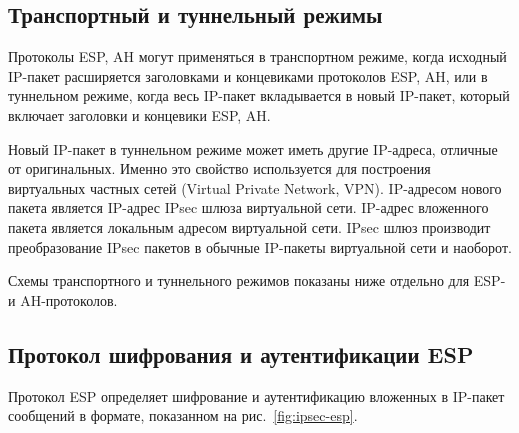 \subsection{Транспортный и туннельный режимы}

Протоколы ESP, AH могут применяться в транспортном режиме, когда исходный IP-пакет расширяется заголовками и концевиками протоколов ESP, AH, или в туннельном режиме, когда весь IP-пакет вкладывается в новый IP-пакет, который включает заголовки и концевики ESP, AH.

Новый IP-пакет в туннельном режиме может иметь другие IP-адреса, отличные от оригинальных. Именно это свойство используется для построения виртуальных частных сетей (Virtual Private Network, VPN). IP-адресом нового пакета является IP-адрес IPsec шлюза виртуальной сети. IP-адрес вложенного пакета является локальным адресом виртуальной сети. IPsec шлюз производит преобразование IPsec пакетов в обычные IP-пакеты виртуальной сети и наоборот.

Схемы транспортного и туннельного режимов показаны ниже отдельно для ESP- и AH-протоколов.


\subsection{Протокол шифрования и аутентификации ESP}

Протокол ESP определяет шифрование и аутентификацию вложенных в IP-пакет сообщений в формате, показанном на рис.~\ref{fig:ipsec-esp}.

